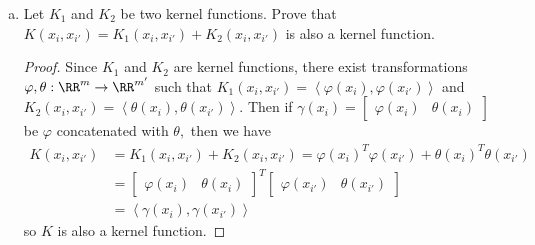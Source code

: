 \documentclass{article}
\begin{document}
\begin{enumerate}[(c)]
	\item Let $K_1$ and $K_2$ be two kernel functions. Prove that $K(x_i,x_{i'}) = K_1(x_i,x_{i'}) + K_2(x_i,x_{i'})$ is also a kernel function.
		\begin{proof}
			Since $K_1$ and $K_2$ are kernel functions, there exist transformations $\varphi, \theta:\RR^m\to\RR^{m'}$ such that $K_1(x_i, x_{i'}) = \left< \varphi(x_i), \varphi(x_{i'})\right>$ and $K_2(x_i, x_{i'}) = \left< \theta(x_i), \theta(x_{i'})\right>.$ Then if $\gamma(x_i)=\begin{bmatrix}
				\varphi(x_i) & \theta(x_i)
			\end{bmatrix}$ be $\varphi$ concatenated with $\theta,$ then we have
			\begin{align*}
				K(x_i, x_{i'}) &= K_1(x_i, x_{i'}) + K_2(x_i, x_{i'}) = \varphi(x_i)^T \varphi(x_{i'}) + \theta(x_i)^T\theta(x_{i'}) \\
				&= \begin{bmatrix}
					\varphi(x_i) & \theta(x_i)
				\end{bmatrix}^T \begin{bmatrix}
					\varphi(x_{i'}) & \theta(x_{i'})
				\end{bmatrix} \\
				&= \left< \gamma(x_i), \gamma(x_{i'})\right>
			\end{align*}
			so $K$ is also a kernel function.
		\end{proof}
\end{enumerate}
\newpage
\end{document}

